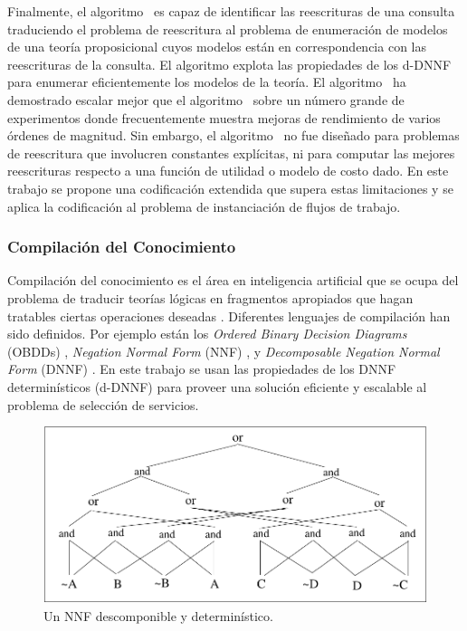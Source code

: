 Finalmente, el algoritmo \mcdsat\ es capaz de identificar las reescrituras de una
consulta traduciendo el problema de reescritura al problema de enumeración de
modelos de una teoría proposicional cuyos modelos están en correspondencia con
las reescrituras de la consulta. El algoritmo explota las propiedades de los
d-DNNF para enumerar eficientemente los modelos de la teoría.
El algoritmo
\mcdsat\ ha demostrado escalar mejor que el algoritmo \minicon\ sobre un número
grande de experimentos donde frecuentemente muestra mejoras de rendimiento de
varios órdenes de magnitud. Sin embargo, el algoritmo \mcdsat\ no fue diseñado
para problemas de reescritura que involucren constantes explícitas, ni para
computar las mejores reescrituras respecto a una función de utilidad o modelo de
costo dado. En este trabajo se propone una codificación extendida que supera
estas limitaciones y se aplica la codificación al problema de instanciación de
flujos de trabajo.

\subsubsection{Compilación del Conocimiento}

Compilación del conocimiento es el área en inteligencia artificial que se ocupa
del problema de traducir teorías lógicas en fragmentos apropiados que hagan
tratables ciertas operaciones deseadas \cite{cadoli:compilation}. Diferentes lenguajes de
compilación han sido definidos. Por ejemplo están los \emph{Ordered
Binary Decision Diagrams} (OBDDs) \cite{bryant:obdd},
\emph{Negation Normal Form} (NNF) \cite{barwise:handbook}, y
\emph{Decomposable Negation Normal Form} (DNNF) \cite{darwiche:map}. En este trabajo se usan las
propiedades de los DNNF determinísticos (d-DNNF) \cite{darwiche:d-dnnfs} para proveer una
solución eficiente y escalable al problema de selección de servicios.

\begin{figure}[t]
\centering
\includegraphics[width=.7\textwidth]{graphics/odd}
\caption{Un NNF descomponible y determinístico.}
\label{fig:dnnf}
\end{figure}

